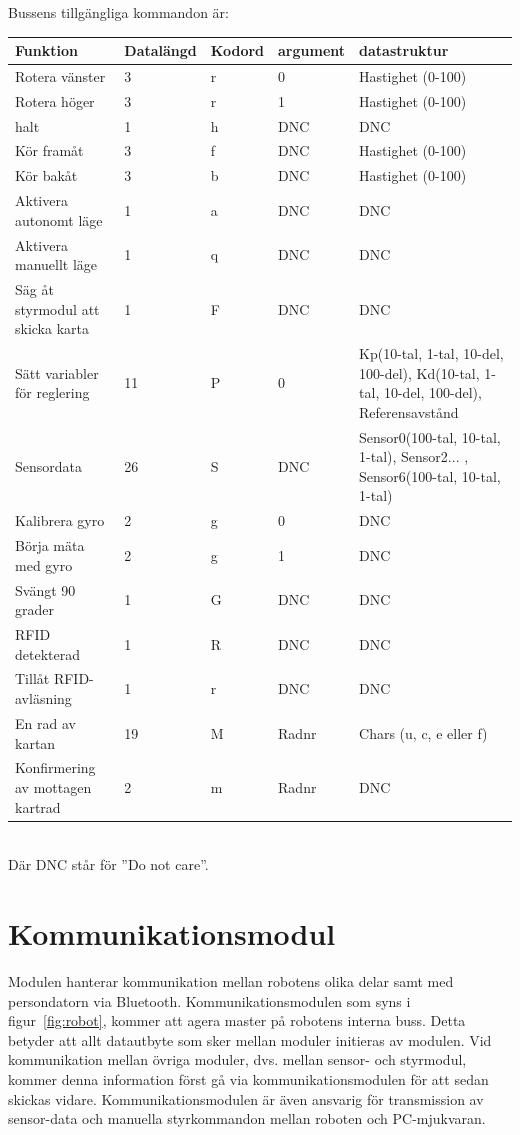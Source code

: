 \documentclass[a4paper,12pt,fleqn]{article}
\begin{document}
Bussens tillgängliga kommandon är:

\begin{tabular}{| p{} | p{} | p{} | p{} | p{} |}
	\hline
	\rowcolor{listinggray}
	\textbf{Funktion} & \textbf{Datalängd} & \textbf{Kodord} & \textbf{argument} & \textbf{datastruktur} \\ \hline
	Rotera vänster & 3 & r & 0 & Hastighet (0-100) \\ \hline
	Rotera höger & 3 & r & 1 & Hastighet (0-100) \\ \hline
	halt & 1 & h & DNC & DNC \\ \hline
	Kör framåt & 3 & f & DNC & Hastighet (0-100) \\ \hline
	Kör bakåt & 3 & b & DNC & Hastighet (0-100) \\ \hline
	Aktivera autonomt läge & 1 & a & DNC & DNC \\ \hline
	Aktivera manuellt läge & 1 & q & DNC & DNC \\ \hline
	Säg åt styrmodul att skicka karta & 1 & F & DNC & DNC \\ \hline
	Sätt variabler för reglering & 11 & P & 0 & Kp(10-tal, 1-tal, 10-del, 100-del), Kd(10-tal, 1-tal, 10-del, 100-del), Referensavstånd \\ \hline
	Sensordata & 26 & S & DNC & Sensor0(100-tal, 10-tal, 1-tal), Sensor2... , Sensor6(100-tal, 10-tal, 1-tal) \\ \hline
	Kalibrera gyro & 2 & g & 0 & DNC \\ \hline
	Börja mäta med gyro & 2 & g & 1 & DNC \\ \hline
	Svängt 90 grader & 1 & G & DNC & DNC \\ \hline
	RFID detekterad & 1 & R & DNC & DNC \\ \hline
	Tillåt RFID-avläsning & 1 & r & DNC & DNC \\ \hline
	En rad av kartan & 19 & M & Radnr & Chars (u, c, e eller f) \\ \hline
	Konfirmering av mottagen kartrad & 2 & m & Radnr & DNC \\ \hline
\end{tabular}
~\\
Där DNC står för ''Do not care''.
\newpage


\section{Kommunikationsmodul}
Modulen hanterar kommunikation mellan robotens olika delar samt med persondatorn via Bluetooth. Kommunikationsmodulen som syns i figur~\ref{fig:robot}, kommer att agera master på robotens interna buss. Detta betyder att allt datautbyte som sker mellan moduler initieras av modulen. 
Vid kommunikation mellan övriga moduler, dvs. mellan sensor- och styrmodul, kommer denna information först gå via kommunikationsmodulen för att sedan skickas vidare.
Kommunikationsmodulen är även ansvarig för transmission av sensor-data och manuella styrkommandon mellan roboten och PC-mjukvaran.
\end{document}
